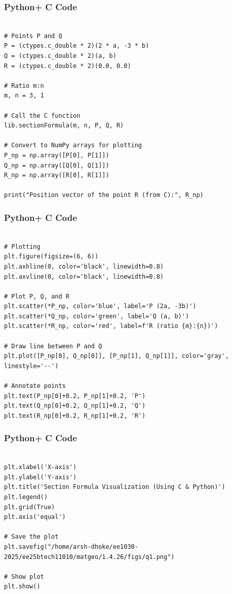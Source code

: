 \documentclass{beamer}
\begin{document}
\begin{frame}[fragile]
    \frametitle{Python+ C Code}

    \begin{lstlisting}
    
# Points P and Q
P = (ctypes.c_double * 2)(2 * a, -3 * b)
Q = (ctypes.c_double * 2)(a, b)
R = (ctypes.c_double * 2)(0.0, 0.0)

# Ratio m:n
m, n = 3, 1

# Call the C function
lib.sectionFormula(m, n, P, Q, R)

# Convert to NumPy arrays for plotting
P_np = np.array([P[0], P[1]])
Q_np = np.array([Q[0], Q[1]])
R_np = np.array([R[0], R[1]])

print("Position vector of the point R (from C):", R_np)

  \end{lstlisting}
\end{frame}

\begin{frame}[fragile]
    \frametitle{Python+ C Code}

    \begin{lstlisting}

# Plotting
plt.figure(figsize=(6, 6))
plt.axhline(0, color='black', linewidth=0.8)
plt.axvline(0, color='black', linewidth=0.8)

# Plot P, Q, and R
plt.scatter(*P_np, color='blue', label='P (2a, -3b)')
plt.scatter(*Q_np, color='green', label='Q (a, b)')
plt.scatter(*R_np, color='red', label=f'R (ratio {m}:{n})')

# Draw line between P and Q
plt.plot([P_np[0], Q_np[0]], [P_np[1], Q_np[1]], color='gray', linestyle='--')

# Annotate points
plt.text(P_np[0]+0.2, P_np[1]+0.2, 'P')
plt.text(Q_np[0]+0.2, Q_np[1]+0.2, 'Q')
plt.text(R_np[0]+0.2, R_np[1]+0.2, 'R')

\end{lstlisting}
\end{frame}

\begin{frame}[fragile]
    \frametitle{Python+ C Code}

    \begin{lstlisting}

plt.xlabel('X-axis')
plt.ylabel('Y-axis')
plt.title('Section Formula Visualization (Using C & Python)')
plt.legend()
plt.grid(True)
plt.axis('equal')

# Save the plot
plt.savefig("/home/arsh-dhoke/ee1030-2025/ee25btech11010/matgeo/1.4.26/figs/q1.png")

# Show plot
plt.show()


      \end{lstlisting}
\end{frame}
\end{document}
